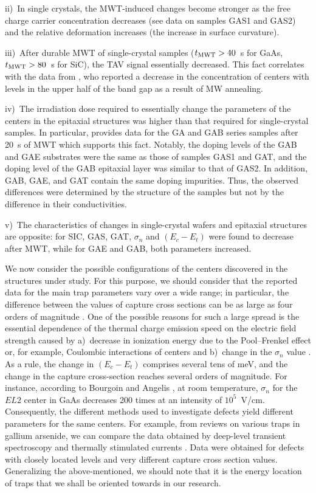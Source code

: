 \documentclass[10pt]{iopart}
\begin{document}
\noindent
ii)~In single crystals, the  MWT-induced changes become stronger as the free charge carrier concentration decreases
(see data on samples GAS1 and GAS2) and the relative deformation increases (the increase in surface curvature).

\noindent
iii)~After durable MWT of single-crystal samples ($t_{\rm MWT}>40$~s for GaAs,  $t_{\rm MWT}>80$~s for SiC),
the TAV signal essentially decreased.
This fact correlates with the data  from \cite{Belyaev1998JTFEn},
who reported a decrease in the concentration of centers with levels in the upper half of the band gap as a result of MW annealing.

\noindent
iv)~The irradiation dose required to essentially change the parameters of the centers in the epitaxial structures was higher than that required for single-crystal samples.
In particular,  provides  data for the GA and GAB series samples after 20~s of MWT
which supports this fact.
Notably, the doping levels of  the GAB and GAE substrates were the same as those of samples GAS1 and GAT,
and the doping level of the GAB epitaxial layer was similar to that of GAS2.
In addition, GAB, GAE, and GAT contain the same doping impurities.
Thus, the observed differences were determined by the structure of the samples but not by the difference in their conductivities.

\noindent
v)~The characteristics of changes in single-crystal wafers and epitaxial structures are opposite:
for SIC, GAS, GAT, $\sigma_n$ and $(E_c-E_t)$ were found to decrease after MWT,
while for GAE and GAB, both parameters increased.


We now consider the possible configurations of the centers discovered in the structures under study.
For this purpose, we should consider that the reported data for the main trap parameters vary over a wide range;
in particular, the difference between the values of capture cross sections can be as large as four orders of magnitude \cite{Pavlovic2000}.
One of the possible reasons for such a large spread is the essential dependence
of the thermal charge emission speed on the electric field strength \cite{Bulyarskii2000,Makram} caused by
a)~decrease in ionization energy due to the Pool--Frenkel effect or, for example, Coulombic interactions of centers \cite{Stellmacher} and
b)~change in the $\sigma_n$  value \cite{Bourgoin2001}.
As a rule, the change in $(E_c-E_t)$ comprises several tens of meV, and
the change in the capture cross-section reaches several orders of magnitude.
For instance, according to Bourgoin and Angelis \cite{Bourgoin2001}, at room temperature,
$\sigma_n$  for the $EL2$ center in GaAs decreases 200 times
at an intensity of $10^5$~V/cm.
Consequently, the different methods used to investigate defects yield  different parameters for the same centers.
For example, from reviews on various traps in gallium arsenide,  we can compare the data  obtained by deep-level transient spectroscopy \cite{Bourgoin:GaAs}
and thermally stimulated currents \cite{Pavlovic2000}.
Data were obtained for defects with closely located levels and very different capture cross section values.
Generalizing the above-mentioned, we should note that it is the energy location of traps that we shall be oriented towards in our research.
\end{document}

